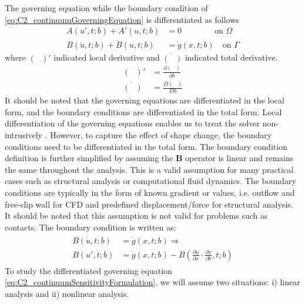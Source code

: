 The governing equation while the boundary condition of \eqref{eq:C2_continuumGoverningEquation} is differentiated as follows
%
\begin{subequations}\label{eq:C2_continuumSensitivityFormulation}
\begin{align}
    A(u', t; b) + A'(u, t; b) &= 0 \qquad \qquad \text{on } \Omega \\
    B(\dot{u}, t; b) + \dot{B}(u, t; b) &= \dot{g}(x, t; b) \quad \text{on } \Gamma
\end{align}    
\end{subequations}
%
where $(\text{ })'$ indicated local derivative and $\dot{(\text{ })}$ indicated total derivative.
%
\begin{subequations}
\begin{align*}
    (\text{ })' &= \frac{\partial (\text{ })}{\partial b} \\
    \dot{(\text{ })} &= \frac{D (\text{ })}{D b}
\end{align*}
\end{subequations}
%
It should be noted that the governing equations are differentiated in the local form, and the boundary conditions are differentiated in the total form. Local differentiation of the governing equations enables us to treat the solver non-intrusively \cite{cross2014local}. However, to capture the effect of shape change, the boundary conditions need to be differentiated in the total form. The boundary condition definition is further simplified by assuming the $\mathbf{B}$ operator is linear and remains the same throughout the analysis. This is a valid assumption for many practical cases such as structural analysis or computational fluid dynamics. The boundary conditions are typically in the form of known gradient or values, i.e. outflow and free-slip wall for CFD and predefined displacement/force for structural analysis. It should be noted that this assumption is not valid for problems such as contacts. The boundary condition is written as:
%
\begin{align}\label{eq:C2_linearSAboundaryCondtions}
\begin{split}
    B(\dot{u}, t; b) &= \dot{g}(x, t; b) \Rightarrow \\
    B(u', t; b) &= \dot{g}(x, t; b) - B(\frac{\partial u}{\partial x} \cdot \frac{\partial x}{\partial b}, t; b)
\end{split}
\end{align}
%
To study the differentiated governing equation \eqref{eq:C2_continuumSensitivityFormulation}, we will assume two situations: i) linear analysis and ii) nonlinear analysis.

